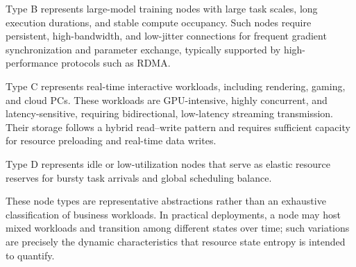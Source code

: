 \documentclass{ccjnl}
\begin{document}
Type B represents large-model training nodes with large task scales,
long execution durations, and stable compute occupancy. Such nodes
require persistent, high-bandwidth, and low-jitter connections for
frequent gradient synchronization and parameter exchange, typically
supported by high-performance protocols such as RDMA.

Type C represents real-time interactive workloads, including
rendering, gaming, and cloud PCs. These workloads are GPU-intensive,
highly concurrent, and latency-sensitive, requiring bidirectional,
low-latency streaming transmission. Their storage follows a hybrid
read--write pattern and requires sufficient capacity for resource
preloading and real-time data writes.

Type D represents idle or low-utilization nodes that serve as elastic
resource reserves for bursty task arrivals and global scheduling
balance.

These node types are representative abstractions rather than an
exhaustive classification of business workloads. In practical
deployments, a node may host mixed workloads and transition among
different states over time; such variations are precisely the dynamic
characteristics that resource state entropy is intended to quantify.
\end{document}
